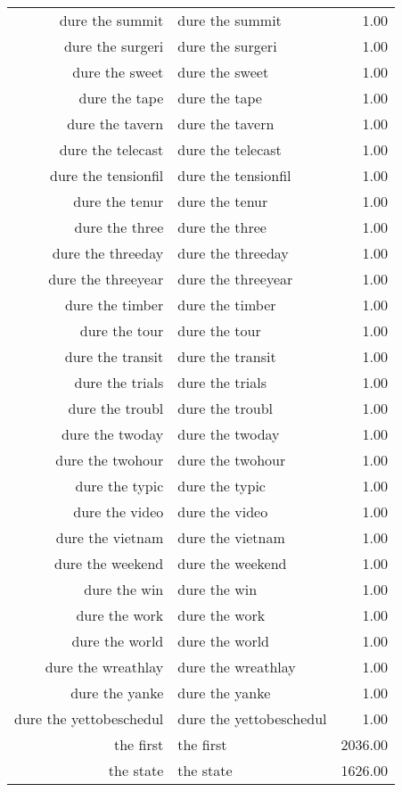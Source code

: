 \begin{table}[ht]
\begin{tabular}{rlr}
  dure the summit & dure the summit & 1.00 \\ 
  dure the surgeri & dure the surgeri & 1.00 \\ 
  dure the sweet & dure the sweet & 1.00 \\ 
  dure the tape & dure the tape & 1.00 \\ 
  dure the tavern & dure the tavern & 1.00 \\ 
  dure the telecast & dure the telecast & 1.00 \\ 
  dure the tensionfil & dure the tensionfil & 1.00 \\ 
  dure the tenur & dure the tenur & 1.00 \\ 
  dure the three & dure the three & 1.00 \\ 
  dure the threeday & dure the threeday & 1.00 \\ 
  dure the threeyear & dure the threeyear & 1.00 \\ 
  dure the timber & dure the timber & 1.00 \\ 
  dure the tour & dure the tour & 1.00 \\ 
  dure the transit & dure the transit & 1.00 \\ 
  dure the trials & dure the trials & 1.00 \\ 
  dure the troubl & dure the troubl & 1.00 \\ 
  dure the twoday & dure the twoday & 1.00 \\ 
  dure the twohour & dure the twohour & 1.00 \\ 
  dure the typic & dure the typic & 1.00 \\ 
  dure the video & dure the video & 1.00 \\ 
  dure the vietnam & dure the vietnam & 1.00 \\ 
  dure the weekend & dure the weekend & 1.00 \\ 
  dure the win & dure the win & 1.00 \\ 
  dure the work & dure the work & 1.00 \\ 
  dure the world & dure the world & 1.00 \\ 
  dure the wreathlay & dure the wreathlay & 1.00 \\ 
  dure the yanke & dure the yanke & 1.00 \\ 
  dure the yettobeschedul & dure the yettobeschedul & 1.00 \\ 
  the first & the first & 2036.00 \\ 
  the state & the state & 1626.00 \\ 

\end{tabular}
\end{table}
